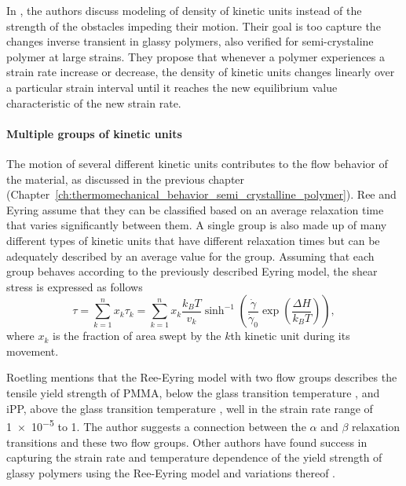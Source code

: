 
In \citep{gsellYieldTransientEffects1981}, the authors discuss modeling of density of kinetic units instead of the strength of the obstacles impeding their motion.
Their goal is too capture the changes inverse transient in glassy polymers, also verified for semi-crystaline polymer at large strains.
They propose that whenever a polymer experiences a strain rate increase or decrease, the density of kinetic units changes linearly over a particular strain interval until it reaches the new equilibrium value characteristic of the new strain rate.

\paragraph{Multiple groups of kinetic units}

The motion of several different kinetic units contributes to the flow behavior of the material, as discussed in the previous chapter (Chapter~\ref{ch:thermomechanical_behavior_semi_crystalline_polymer}).
Ree and Eyring \citep{reeTheoryNonNewtonian1955} assume that they can be classified based on an average relaxation time that varies significantly between them.
A single group is also made up of many different types of kinetic units that have different relaxation times but can be adequately described by an average value for the group.
Assuming that each group behaves according to the previously described Eyring model, the shear stress is expressed as follows
\begin{equation}
	\tau=\sum_{k=1}^n x_k \tau_k = \sum_{k=1}^n x_k\frac{k_B T}{v_k} \sinh^{-1}\left(\frac{\dot\gamma}{\dot\gamma_0}\exp\left(\frac{\Delta H}{k_B T}\right)\right),
\end{equation}
where $x_k$ is the fraction of area swept by the $k$th kinetic unit during its movement.

Roetling mentions that the Ree-Eyring model with two flow groups describes the tensile yield strength of PMMA, below the glass transition temperature \citep{roetlingYieldStressBehaviour1965}, and iPP, above the glass transition temperature \citep{roetlingYieldStressBehaviour1966}, well in the strain rate range of \num{1e-5} to \num{1}.
The author suggests a connection between the $\alpha$ and $\beta$ relaxation transitions and these two flow groups.
Other authors have found success in capturing the strain rate and temperature dependence of the yield strength of glassy polymers using the Ree-Eyring model and variations thereof \citep{bauwensTensileYieldstressBehavior1969, bauwensRelationCompressionYield1972, bauwens-crowetCompressionYieldBehaviour1973, haussyThermodynamicAnalysisPlastic1980}.

